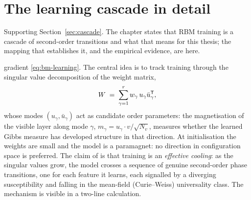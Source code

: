 \section{The learning cascade in detail}\label{sec:cascade-detail}

Supporting Section~\ref{sec:cascade}. The chapter states that RBM training is
a cascade of second-order transitions and what that means for this thesis; the
mapping that establishes it, and the empirical evidence, are here.

gradient \eqref{eq:bm-learning}. The central idea is to track training
through the singular value decomposition of the weight matrix,
\begin{equation}
  W \;=\; \sum_{\gamma=1}^{r} w_\gamma\, u_\gamma \bar u_\gamma^{\mathsf{T}} ,
  \label{eq:rbm-svd}
\end{equation}
whose modes $(u_\gamma, \bar u_\gamma)$ act as candidate order
parameters: the magnetisation of the visible layer along mode $\gamma$,
$m_\gamma = u_\gamma \cdot v / \sqrt{N_v}$, measures whether the learned
Gibbs measure has developed structure in that direction. At
initialisation the weights are small and the model is a paramagnet: no
direction in configuration space is preferred. The claim of
\citet{bachtis2024cascade} is that training is an \emph{effective
cooling}: as the singular values grow, the model crosses a sequence of
genuine second-order phase transitions, one for each feature it learns,
each signalled by a diverging susceptibility and falling in the
mean-field (Curie--Weiss) universality class. The mechanism is visible in
a two-line calculation.

